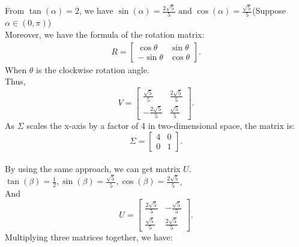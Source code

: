 \documentclass{article}
\begin{document}
\subsection{} %
From $ \tan(\alpha  ) = 2 $, we have $ \sin(\alpha ) = \frac{2\sqrt{5}}{5} \text { and  } \cos(\alpha  ) = \frac{\sqrt5}{5} $(Suppose $ \alpha \in (0, \pi) $)\\
Moreover, we have the formula of the rotation matrix:
\begin{align*}
    R = \begin{bmatrix}
    \cos\theta  & \sin\theta  \\
    -\sin\theta  & \cos\theta
    \end{bmatrix}.
\end{align*} 
When $ \theta $ is the clockwise rotation angle. \\
Thus, $$ V = \begin{bmatrix}
\frac{\sqrt5 }{5} & \frac{2\sqrt{5}}{5} \\
-\frac{2\sqrt{5}}{5} & \frac{\sqrt 5 }{5}
\end{bmatrix} .$$
As $ \Sigma  $ scales the x-axis by a factor of 4 in two-dimensional space, the matrix is: $$ \Sigma = \begin{bmatrix}
4 & 0 \\
0 & 1
\end{bmatrix} .$$ \\
By using the same approach, we can get matrix $ U $. $ \tan(\beta) = \frac{1}{2}, \sin(\beta) = \frac{\sqrt{5}}{5}, \cos(\beta) = \frac{2 \sqrt{5}}{5} $,\\
And $$ U = \begin{bmatrix}
\frac{2 \sqrt{5}}{5} & -\frac{\sqrt{5}}{5} \\
\frac{\sqrt{5}}{5} & \frac{2 \sqrt{5}}{5}
\end{bmatrix} .$$
Multiplying three matrices together, we have:
\end{document}
